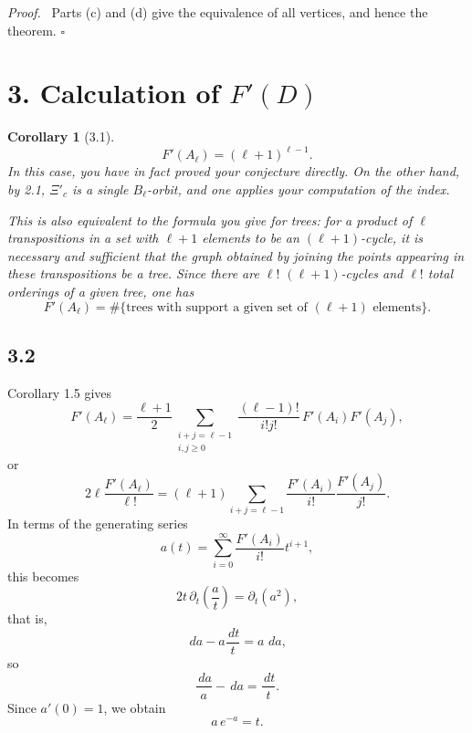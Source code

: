 \documentclass[11pt]{article}
\newcommand{\dd}{\,d}
\newcommand{\card}{\#}
\theoremstyle{plainen}
\newtheorem*{corollaryx}{Corollary}
\newenvironment{proofx}{\par\emph{Proof.}\ }{\hfill$\square$\par}
\begin{document}
\begin{proofx}
Parts (c) and (d) give the equivalence of all vertices, and hence the theorem.
\end{proofx}

\section*{3. Calculation of $F'(D)$}

\begin{corollaryx}[3.1]
\[
 F'(A_\ell)=(\ell+1)^{\ell-1}.
\]
In this case, you have in fact proved your conjecture directly. On the other hand, by 2.1, $\Xi'_c$ is a single $B_\ell$-orbit, and one applies your computation of the index.

This is also equivalent to the formula you give for trees: for a product of $\ell$ transpositions in a set with $\ell+1$ elements to be an $(\ell+1)$-cycle, it is necessary and sufficient that the graph obtained by joining the points appearing in these transpositions be a tree. Since there are $\ell!$ $(\ell+1)$-cycles and $\ell!$ total orderings of a given tree, one has
\[
 F'(A_\ell)=\card\{\text{trees with support a given set of }(\ell+1)\text{ elements}\}.
\]
\end{corollaryx}

\subsection*{3.2}
Corollary 1.5 gives
\[
F'(A_\ell)=\frac{\ell+1}{2}
\sum_{\substack{i+j=\ell-1\\ i,j\ge0}}
\frac{(\ell-1)!}{i!j!}\,F'(A_i)F'(A_j),
\]
or
\[
2\ell\frac{F'(A_\ell)}{\ell!}=(\ell+1)
\sum_{i+j=\ell-1}\frac{F'(A_i)}{i!}\frac{F'(A_j)}{j!}.
\]
In terms of the generating series
\[
 a(t)=\sum_{i=0}^{\infty}\frac{F'(A_i)}{i!}t^{i+1},
\]
this becomes
\[
2t\,\partial_t\left(\frac{a}{t}\right)=\partial_t(a^2),
\]
that is,
\[
 \dd a-a\frac{\dd t}{t}=a\,\dd a,
\]
so
\[
 \frac{\dd a}{a}-\dd a=\frac{\dd t}{t}.
\]
Since $a'(0)=1$, we obtain
\[
 a\,e^{-a}=t.
\]
\end{document}
